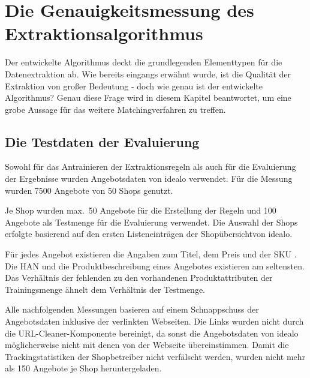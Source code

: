 \section{Die Genauigkeitsmessung des Extraktionsalgorithmus}
\label{sec:evaluierung}

Der entwickelte Algorithmus deckt die grundlegenden Elementtypen für die Datenextraktion ab.
Wie bereits eingangs erwähnt wurde, ist die Qualität der Extraktion von großer Bedeutung - doch wie genau ist der
entwickelte Algorithmus?
Genau diese Frage wird in diesem Kapitel beantwortet, um eine grobe Aussage für das weitere Matchingverfahren zu
treffen.

\subsection{Die Testdaten der Evaluierung}
\label{subsec:testdaten}
Sowohl für das Antrainieren der Extraktionsregeln als auch für die Evaluierung der Ergebnisse wurden Angebotsdaten
von idealo verwendet.
Für die Messung wurden 7500 Angebote von 50 Shops genutzt.

Je Shop wurden max.\ 50 Angebote für die Erstellung der Regeln und 100 Angebote als Testmenge für die Evaluierung
verwendet.
Die Auswahl der Shops erfolgte basierend auf den ersten Listeneinträgen der Shopübersicht\footnotemark von idealo.

Für jedes Angebot existieren die Angaben zum Titel, dem Preis und der SKU .
Die HAN und die Produktbeschreibung eines Angebotes existieren am seltensten.
Das Verhältnis der fehlenden zu den vorhandenen Produktattributen der Trainingsmenge ähnelt dem Verhältnis der
Testmenge.

Alle nachfolgenden Messungen basieren auf einem Schnappschuss der Angebotsdaten inklusive der verlinkten Webseiten.
Die Links wurden nicht durch die URL-Cleaner-Komponente bereinigt, da sonst die Angebotsdaten von idealo
möglicherweise nicht mit denen von der Webseite übereinstimmen.
Damit die Trackingstatistiken der Shopbetreiber nicht verfälscht werden, wurden nicht mehr als 150 Angebote je Shop
heruntergeladen.

